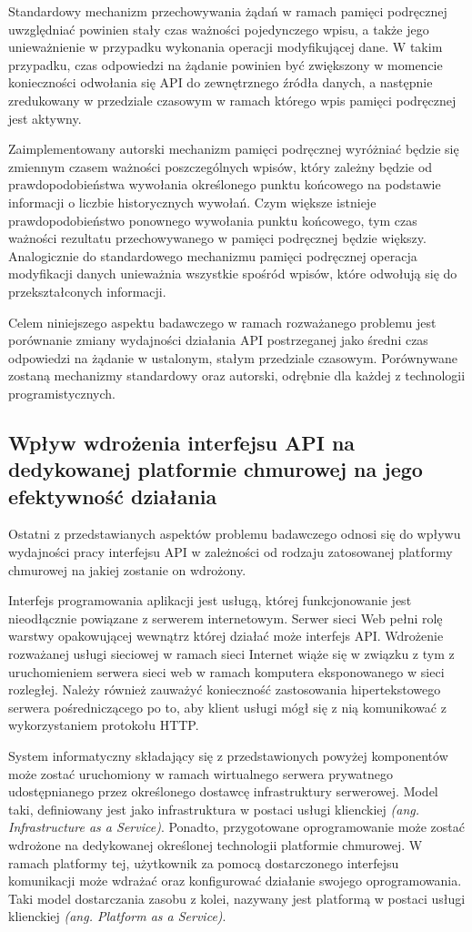 Standardowy mechanizm przechowywania żądań w ramach pamięci podręcznej uwzględniać powinien stały czas ważności pojedynczego wpisu, a także jego unieważnienie w przypadku wykonania operacji modyfikującej dane. W takim przypadku, czas odpowiedzi na żądanie powinien być zwiększony w momencie konieczności odwołania się API do zewnętrznego źródła danych, a następnie zredukowany w przedziale czasowym w ramach którego wpis pamięci podręcznej jest aktywny.

Zaimplementowany autorski mechanizm pamięci podręcznej wyróżniać będzie się zmiennym czasem ważności poszczególnych wpisów, który zależny będzie od prawdopodobieństwa wywołania określonego punktu końcowego na podstawie informacji o liczbie historycznych wywołań. Czym większe istnieje prawdopodobieństwo ponownego wywołania punktu końcowego, tym czas ważności rezultatu przechowywanego w pamięci podręcznej będzie większy. Analogicznie do standardowego mechanizmu pamięci podręcznej operacja modyfikacji danych unieważnia wszystkie spośród wpisów, które odwołują się do przekształconych informacji.

Celem niniejszego aspektu badawczego w ramach rozważanego problemu jest porównanie zmiany wydajności działania API postrzeganej jako średni czas odpowiedzi na żądanie w ustalonym, stałym przedziale czasowym. Porównywane zostaną mechanizmy standardowy oraz autorski, odrębnie dla każdej z technologii programistycznych.
\subsection*{Wpływ wdrożenia interfejsu API na dedykowanej platformie chmurowej na jego efektywność działania}
Ostatni z przedstawianych aspektów problemu badawczego odnosi się do wpływu wydajności pracy interfejsu API w zależności od rodzaju zatosowanej platformy chmurowej na jakiej zostanie on wdrożony.

Interfejs programowania aplikacji jest usługą, której funkcjonowanie jest nieodłącznie powiązane z serwerem internetowym. Serwer sieci Web pełni rolę warstwy opakowującej wewnątrz której działać może interfejs API. Wdrożenie rozważanej usługi sieciowej w ramach sieci Internet wiąże się w związku z tym z uruchomieniem serwera sieci web w ramach komputera eksponowanego w sieci rozległej. Należy również zauważyć konieczność zastosowania hipertekstowego serwera pośredniczącego po to, aby klient usługi mógł się z nią komunikować z wykorzystaniem protokołu HTTP.

System informatyczny składający się z przedstawionych powyżej komponentów może zostać uruchomiony w ramach wirtualnego serwera prywatnego udostępnianego przez określonego dostawcę infrastruktury serwerowej. Model taki, definiowany jest jako infrastruktura w postaci usługi klienckiej \textit{(ang. Infrastructure as a Service)}. Ponadto, przygotowane oprogramowanie może zostać wdrożone na dedykowanej określonej technologii platformie chmurowej. W ramach platformy tej, użytkownik za pomocą dostarczonego interfejsu komunikacji może wdrażać oraz konfigurować działanie swojego oprogramowania. Taki model dostarczania zasobu z kolei, nazywany jest platformą w postaci usługi klienckiej \textit{(ang. Platform as a Service)}.

